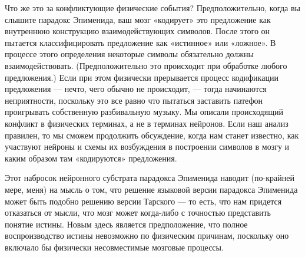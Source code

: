 \documentclass[../main.tex]{subfiles}
\begin{document}
Что же это за конфликтующие физические события? Предположительно, когда вы слышите парадокс Эпименида, ваш мозг «кодирует» это предложение как внутреннюю конструкцию взаимодействующих символов. После этого он пытается классифицировать предложение как «истинное» или «ложное». В процессе этого определения некоторые символы обязательно должны взаимодействовать. (Предположительно это происходит при обработке любого предложения.) Если при этом физически прерывается процесс кодификации предложения --- нечто, чего обычно не происходит, --- тогда начинаются неприятности, поскольку это все равно что пытаться заставить патефон проигрывать собственную разбивальную музыку. Мы описали происходящий конфликт в физических терминах, а не в терминах нейронов. Если наш анализ правилен, то мы сможем продолжить обсуждение, когда нам станет известно, как участвуют нейроны и схемы их возбуждения в построении символов в мозгу и каким образом там «кодируются» предложения.

Этот набросок нейронного субстрата парадокса Эпименида наводит (по-крайней мере, меня) на мысль о том, что решение языковой версии парадокса Эпименида может быть подобно решению версии Тарского --- то есть, что нам придется отказаться от мысли, что мозг может когда-либо с точностью представить понятие истины. Новым здесь является предположение, что полное воспроизводство истины невозможно по физическим причинам, поскольку оно включало бы физически несовместимые мозговые процессы.
\end{document}
